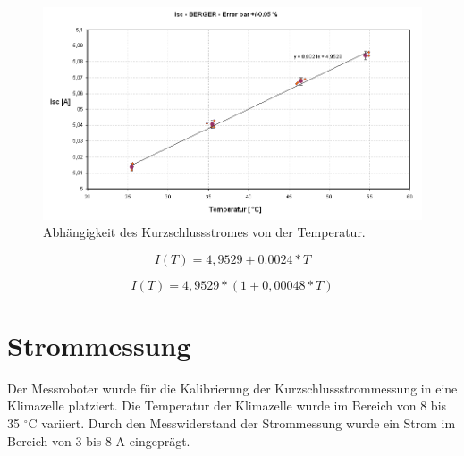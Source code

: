 \documentclass[a4paper,bibtotoc,oneside]{scrbook}
\begin{document}
\begin{figure}[htbp]
\centering
\includegraphics[width=150mm]{img/tempkoef.png}
\caption{Abhängigkeit des Kurzschlussstromes von der Temperatur.}\label{tempkoef}
\end{figure}

  \begin{equation}
     I(T) = 4,9529+0.0024 \ast T
  \end{equation}
  
    \begin{equation}
     I(T) = 4,9529 \ast ( 1 + 0,00048 \ast T)
  \end{equation}

\section{Strommessung}\thispagestyle{empty}

Der Messroboter wurde für die Kalibrierung der Kurzschlussstrommessung in eine Klimazelle platziert.  Die Temperatur der Klimazelle wurde im Bereich von 8 bis 35 $^{\circ}$C variiert. Durch den Messwiderstand der Strommessung wurde ein Strom im Bereich von 3 bis 8 A eingeprägt.  
\end{document}

